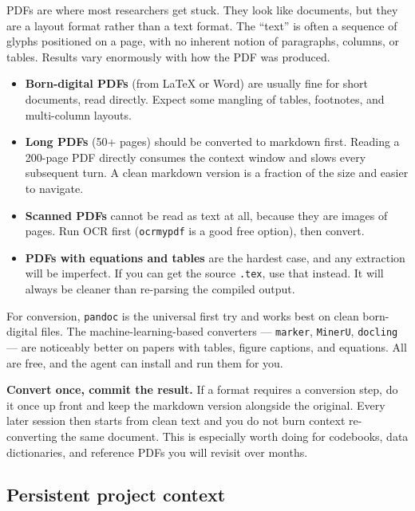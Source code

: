 \documentclass[11pt,a4paper]{article}
\newcommand{\code}[1]{\texttt{\small #1}}
\begin{document}
PDFs are where most researchers get stuck. They look like documents, but they are
a layout format rather than a text format. The ``text'' is often a sequence of
glyphs positioned on a page, with no inherent notion of paragraphs, columns, or
tables. Results vary enormously with how the PDF was produced.

\begin{itemize}
\item \textbf{Born-digital PDFs} (from LaTeX or Word) are usually fine for short
  documents, read directly. Expect some mangling of tables, footnotes, and
  multi-column layouts.
\item \textbf{Long PDFs} (50+ pages) should be converted to markdown first.
  Reading a 200-page PDF directly consumes the context window and slows every
  subsequent turn. A clean markdown version is a fraction of the size and easier
  to navigate.
\item \textbf{Scanned PDFs} cannot be read as text at all, because they are
  images of pages. Run OCR first (\code{ocrmypdf} is a good free option), then convert.
\item \textbf{PDFs with equations and tables} are the hardest case, and any
  extraction will be imperfect. If you can get the source \code{.tex}, use that
  instead. It will always be cleaner than re-parsing the compiled output.
\end{itemize}

For conversion, \code{pandoc} is the universal first try and works best on clean
born-digital files. The machine-learning-based converters --- \code{marker},
\code{MinerU}, \code{docling} --- are noticeably better on papers with tables,
figure captions, and equations. All are free, and the agent can install and run
them for you.

\begin{aside}
\textbf{Convert once, commit the result.} If a format requires a conversion step,
do it once up front and keep the markdown version alongside the original. Every
later session then starts from clean text and you do not burn context
re-converting the same document. This is especially worth doing for codebooks,
data dictionaries, and reference PDFs you will revisit over months.
\end{aside}

\subsection{Persistent project context}
\label{sec:context-file}
\end{document}
